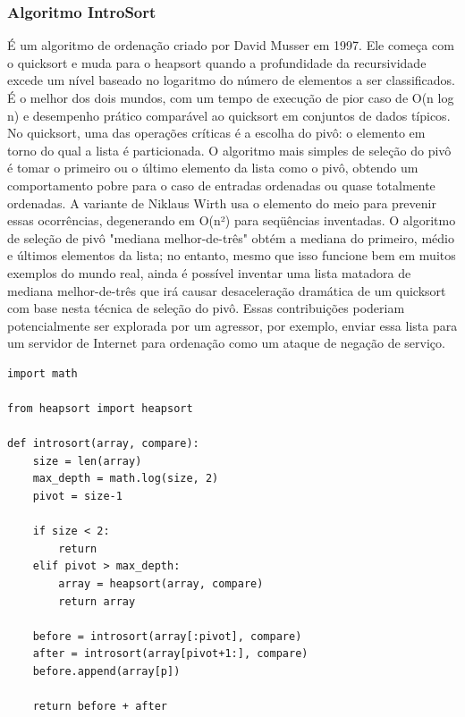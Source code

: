 \documentclass[a4paper,12pt]{scrartcl}
\begin{document}
\subsubsection{Algoritmo IntroSort}
É um algoritmo de ordenação criado por David Musser em 1997. Ele começa com o quicksort e muda para o heapsort quando a profundidade da recursividade excede um nível baseado no logaritmo do número de elementos a ser classificados. É o melhor dos dois mundos, com um tempo de execução de pior caso de O(n log n) e desempenho prático comparável ao quicksort em conjuntos de dados típicos. 
No quicksort, uma das operações críticas é a escolha do pivô: o elemento em torno do qual a lista é particionada. O algoritmo mais simples de seleção do pivô é tomar o primeiro ou o último elemento da lista como o pivô, obtendo um comportamento pobre para o caso de entradas ordenadas ou quase totalmente ordenadas. A variante de Niklaus Wirth usa o elemento do meio para prevenir essas ocorrências, degenerando em O(n²) para seqüências inventadas. O algoritmo de seleção de pivô "mediana melhor-de-três" obtém a mediana do primeiro, médio e últimos elementos da lista; no entanto, mesmo que isso funcione bem em muitos exemplos do mundo real, ainda é possível inventar uma lista matadora de mediana melhor-de-três que irá causar desaceleração dramática de um quicksort com base nesta técnica de seleção do pivô. Essas contribuições poderiam potencialmente ser explorada por um agressor, por exemplo, enviar essa lista para um servidor de Internet para ordenação como um ataque de negação de serviço.


\begin{lstlisting}
import math

from heapsort import heapsort

def introsort(array, compare):
    size = len(array)
    max_depth = math.log(size, 2)
    pivot = size-1

    if size < 2:
        return
    elif pivot > max_depth:
        array = heapsort(array, compare)
        return array

    before = introsort(array[:pivot], compare)
    after = introsort(array[pivot+1:], compare)
    before.append(array[p])
    
    return before + after
\end{lstlisting}
\end{document}
